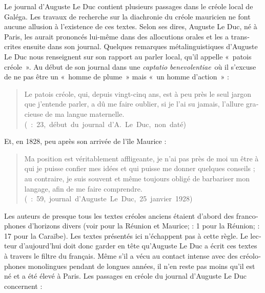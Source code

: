\documentclass[output=paper]{langscibook}
\begin{document}
\begin{otherlanguage}{french}
Le journal d’Auguste Le Duc contient plusieurs passages dans le créole local de Galéga. Les travaux de recherche sur la diachronie du créole mauricien ne font aucune allusion à l’existence de ces textes. Selon ses dires, Auguste Le Duc, né à Paris, les aurait prononcés lui-même dans des allocutions orales et les a transcrites ensuite dans son journal. Quelques remarques métalinguistiques d’Auguste Le Duc nous renseignent sur son rapport au parler local, qu’il appelle «~patois créole~». Au début de son journal dans une \textit{captatio benevolentiae}~où il s’excuse de ne pas être un «~homme de plume~» mais «~un homme d’action~» :

\begin{quote}
Le patois créole, qui, depuis vingt-cinq ans, est à peu près le seul jargon que j’entende parler, a dû me faire oublier, si je l’ai su jamais, l’allure gracieuse de ma langue maternelle. \\\hbox{}\hfill
\hbox{(\citealt{Pourcelet1994} : 23, début du journal d’A. Le Duc, non daté)}
\end{quote}

Et, en 1828, peu après son arrivée de l’île Maurice : 

\begin{quote}
Ma position est véritablement affligeante, je n’ai pas près de moi un être à qui je puisse confier mes idées et qui puisse me donner quelques conseils ; au contraire, je suis souvent et même toujours obligé de barbariser mon langage, afin de me faire comprendre.\\\hbox{}\hfill\hbox{(\citealt{Pourcelet1994} : 59, journal d’Auguste Le Duc, 25 janvier 1928)}
\end{quote}

Les auteurs de presque tous les textes créoles anciens étaient d’abord des francophones d’horizons divers (voir \citealt{Chaudenson1981} pour la Réunion et Maurice; \citealt{Bollée2007} : 1 pour la Réunion; \citealt{Hazaël-Massieux2008} : 17 pour la Caraïbe). Les textes présentés ici n’échappent pas à cette règle. Le lecteur d’aujourd’hui doit donc garder en tête qu’Auguste Le Duc a écrit ces textes à travers le filtre du français. Même s’il a vécu au contact intense avec des créolophones monolingues pendant de longues années, il n’en reste pas moins qu’il est né et a été élevé à Paris. Les passages en créole du journal d’Auguste Le Duc concernent :


\end{otherlanguage}
\end{document}
